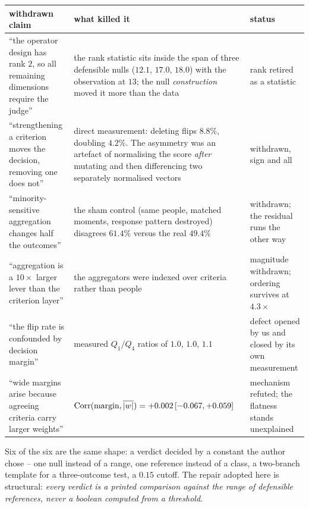 \begin{table}[H]\centering\footnotesize
\begin{tabularx}{\textwidth}{P{4.2cm}P{4.6cm}Y}
\toprule
withdrawn claim & what killed it & status\\
\midrule
``the operator design has rank $2$, so all remaining dimensions require the
judge'' & the rank statistic sits inside the span of three defensible nulls
($12.1$, $17.0$, $18.0$) with the observation at $13$; the null
\emph{construction} moved it more than the data & rank retired as a statistic\\
``strengthening a criterion moves the decision, removing one does not'' & direct
measurement: deleting flips $8.8\%$, doubling $4.2\%$. The asymmetry was an
artefact of normalising the score \emph{after} mutating and then differencing two
separately normalised vectors & withdrawn, sign and all\\
``minority-sensitive aggregation changes half the outcomes'' & the sham control
(same people, matched moments, response pattern destroyed) disagrees $61.4\%$
versus the real $49.4\%$ & withdrawn; the residual runs the other way\\
``aggregation is a $10\times$ larger lever than the criterion layer'' & the
aggregators were indexed over criteria rather than people & magnitude withdrawn;
ordering survives at $4.3\times$\\
``the flip rate is confounded by decision margin'' & measured $Q_1/Q_4$ ratios of
$1.0$, $1.0$, $1.1$ & defect opened by us and closed by its own measurement\\
``wide margins arise because agreeing criteria carry larger weights'' &
$\operatorname{Corr}(\text{margin},\overline{|w|}) = +0.002\,[-0.067,+0.059]$ & mechanism
refuted; the flatness stands unexplained\\
\bottomrule
\end{tabularx}
\end{table}

\begin{remark}
Six of the six are the same shape: a verdict decided by a constant the author
chose -- one null instead of a range, one reference instead of a class, a
two-branch template for a three-outcome test, a $0.15$ cutoff. The repair adopted
here is structural: \emph{every verdict is a printed comparison against the range
of defensible references, never a boolean computed from a threshold}.
\end{remark}

